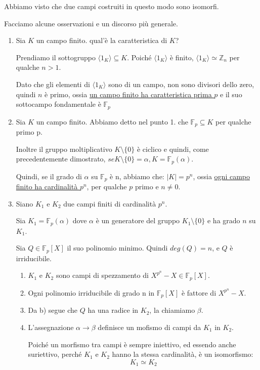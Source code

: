 \documentclass[../main.tex]{subfiles}
\begin{document}
Abbiamo visto che due campi costruiti in questo modo sono isomorfi.

Facciamo alcune osservazioni e un discorso più generale.

\begin{enumerate}
    \item Sia $K$ un campo finito. qual'è la caratteristica di $K$?

          Prendiamo il sottogruppo $\langle1_K\rangle \subseteq K$. Poiché $\langle1_K\rangle$ è finito, $\langle1_K\rangle \simeq \mathbb{Z}_n$ per qualche $n > 1$.

          Dato che gli elementi di $\langle1_K\rangle$ sono di un campo, non sono divisori dello zero, quindi $n$ è primo, ossia \underline{un campo finito ha caratteristica prima $p$} e il suo sottocampo fondamentale è $\mathbb{F}_p$
    \item Sia $K$ un campo finito. Abbiamo detto nel punto 1. che $\mathbb{F}_p \subseteq K$ per qualche primo p.

          Inoltre il gruppo moltiplicativo $K \setminus \{0\}$ è ciclico e quindi, come precedentemente dimostrato, $se K \setminus \{0\} = \alpha, K = \mathbb{F}_p(\alpha)$.

          Quindi, se il grado di $\alpha$ su $\mathbb{F}_p$ è n, abbiamo che: $|K| = p^n$, ossia \underline{ogni campo finito ha cardinalità $p^n$}, per qualche $p$ primo e $n \neq 0$.
    \item Siano $K_1$ e $K_2$ due campi finiti di cardinalità $p^n$.

          Sia $K_1 = \mathbb{F}_p(\alpha)$ dove $\alpha$ è un generatore del gruppo $K_1 \setminus \{0\}$ e ha grado $n$ su $K_1$.

          Sia $Q \in \mathbb{F}_p[X]$ il suo polinomio minimo. Quindi $deg(Q) = n$, e $Q$ è irriducibile.
          \begin{enumerate}[label=\alph*)]
              \item $K_1$ e $K_2$ sono campi di spezzamento di $X^{p^n} - X \in \mathbb{F}_p[X]$.
              \item Ogni polinomio irriducibile di grado n in $\mathbb{F}_p[X]$ è fattore di $X^{p^n} - X$.
              \item Da b) segue che $Q$ ha una radice in $K_2$, la chiamiamo $\beta$.
              \item L'assegnazione $\alpha \rightarrow \beta$ definisce un mofismo di campi da $K_1$ in $K_2$.

                    Poiché un morfismo tra campi è sempre iniettivo, ed essendo anche suriettivo, perché $K_1$ e $K_2$ hanno la stessa cardinalità, è un isomorfismo:
                    \begin{equation*}
                        K_1 \simeq K_2
                    \end{equation*}
          \end{enumerate}
\end{enumerate}
\end{document}
